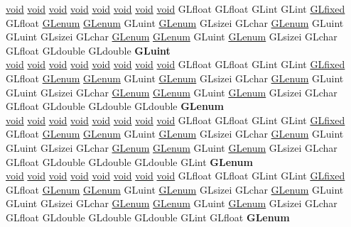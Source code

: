 \begin{DoxyCompactItemize}
\begin{tabbing}
\>\hyperlink{interfacevoid}{void} \hyperlink{interfacevoid}{void} \hyperlink{interfacevoid}{void} \hyperlink{interfacevoid}{void} \hyperlink{interfacevoid}{void} \hyperlink{interfacevoid}{void} \hyperlink{interfacevoid}{void} \hyperlink{interfacevoid}{void} GLfloat GLfloat GLint GLint \hyperlink{glheader_8h_ad6d3fa892df40dedf48ee6d84529ae5e}{GLfixed} GLfloat \hyperlink{interfacevoid}{GLenum} \hyperlink{interfacevoid}{GLenum} GLuint \hyperlink{interfacevoid}{GLenum} GLsizei GLchar \hyperlink{interfacevoid}{GLenum} GLuint GLuint GLsizei GLchar \hyperlink{interfacevoid}{GLenum} \hyperlink{interfacevoid}{GLenum} GLuint \hyperlink{interfacevoid}{GLenum} GLsizei GLchar GLfloat GLdouble GLdouble {\bfseries GLuint}\\
\>\hyperlink{interfacevoid}{void} \hyperlink{interfacevoid}{void} \hyperlink{interfacevoid}{void} \hyperlink{interfacevoid}{void} \hyperlink{interfacevoid}{void} \hyperlink{interfacevoid}{void} \hyperlink{interfacevoid}{void} \hyperlink{interfacevoid}{void} GLfloat GLfloat GLint GLint \hyperlink{glheader_8h_ad6d3fa892df40dedf48ee6d84529ae5e}{GLfixed} GLfloat \hyperlink{interfacevoid}{GLenum} \hyperlink{interfacevoid}{GLenum} GLuint \hyperlink{interfacevoid}{GLenum} GLsizei GLchar \hyperlink{interfacevoid}{GLenum} GLuint GLuint GLsizei GLchar \hyperlink{interfacevoid}{GLenum} \hyperlink{interfacevoid}{GLenum} GLuint \hyperlink{interfacevoid}{GLenum} GLsizei GLchar GLfloat GLdouble GLdouble GLdouble {\bfseries GLenum}\\
\>\hyperlink{interfacevoid}{void} \hyperlink{interfacevoid}{void} \hyperlink{interfacevoid}{void} \hyperlink{interfacevoid}{void} \hyperlink{interfacevoid}{void} \hyperlink{interfacevoid}{void} \hyperlink{interfacevoid}{void} \hyperlink{interfacevoid}{void} GLfloat GLfloat GLint GLint \hyperlink{glheader_8h_ad6d3fa892df40dedf48ee6d84529ae5e}{GLfixed} GLfloat \hyperlink{interfacevoid}{GLenum} \hyperlink{interfacevoid}{GLenum} GLuint \hyperlink{interfacevoid}{GLenum} GLsizei GLchar \hyperlink{interfacevoid}{GLenum} GLuint GLuint GLsizei GLchar \hyperlink{interfacevoid}{GLenum} \hyperlink{interfacevoid}{GLenum} GLuint \hyperlink{interfacevoid}{GLenum} GLsizei GLchar GLfloat GLdouble GLdouble GLdouble GLint {\bfseries GLenum}\\
\>\hyperlink{interfacevoid}{void} \hyperlink{interfacevoid}{void} \hyperlink{interfacevoid}{void} \hyperlink{interfacevoid}{void} \hyperlink{interfacevoid}{void} \hyperlink{interfacevoid}{void} \hyperlink{interfacevoid}{void} \hyperlink{interfacevoid}{void} GLfloat GLfloat GLint GLint \hyperlink{glheader_8h_ad6d3fa892df40dedf48ee6d84529ae5e}{GLfixed} GLfloat \hyperlink{interfacevoid}{GLenum} \hyperlink{interfacevoid}{GLenum} GLuint \hyperlink{interfacevoid}{GLenum} GLsizei GLchar \hyperlink{interfacevoid}{GLenum} GLuint GLuint GLsizei GLchar \hyperlink{interfacevoid}{GLenum} \hyperlink{interfacevoid}{GLenum} GLuint \hyperlink{interfacevoid}{GLenum} GLsizei GLchar GLfloat GLdouble GLdouble GLdouble GLint GLfloat {\bfseries GLenum}\\

\end{tabbing}
\end{DoxyCompactItemize}
